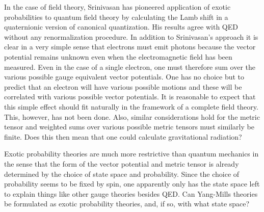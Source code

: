 \documentclass[12pt]{article}
\begin{document}
   In the case of field theory, Srinivasan has pioneered application
of exotic probabilities to quantum field theory by calculating the 
Lamb shift in a quaternionic version of canonical quantization.  His
results agree with QED without any renormalization
procedure.  
In addition to Srinivasan's approach it is clear in a very 
simple sense that electrons 
must emit photons because the vector potential remains unknown even when the 
electromagnetic field has been measured. Even in the case of a single 
electron, one must therefore sum over the various possible gauge equivalent
vector potentials.  One has no choice but to predict that an electron
will have various possible motions and these will be correlated with 
various possible vector potentials.  It is reasonable to expect that 
this simple effect should fit naturally in the framework of a complete
field theory.  This, however, has not been done.  Also, similar 
considerations hold for the metric tensor and weighted sums over
various possible metric tensors must similarly be finite.  Does this then mean
that one could calculate gravitational radiation?  

    Exotic probability theories are much more restrictive than
quantum mechanics in the sense that the form of the vector potential
and metric tensor is already determined by the choice of state space and
probability.  Since the choice of probability seems to be fixed by
spin, one apparently only has the state space left to explain things
like other gauge theories besides QED. Can Yang-Mills theories be
formulated as exotic probability theories, and, if so, with what
state space?
\end{document}
